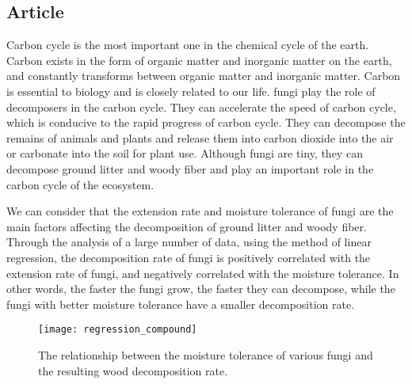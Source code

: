 \documentclass{mcmthesis}
\begin{document}
\begin{appendices}

\section{Article}







Carbon cycle is the most important one in the chemical cycle of the earth. Carbon exists in the form of organic matter and inorganic matter on the earth, and constantly transforms between organic matter and inorganic matter. Carbon is essential to biology and is closely related to our life. fungi play the role of decomposers in the carbon cycle. They can accelerate the speed of carbon cycle, which is conducive to the rapid progress of carbon cycle. They can decompose the remains of animals and plants and release them into carbon dioxide into the air or carbonate into the soil for plant use. Although fungi are tiny, they can decompose ground litter and woody fiber and play an important role in the carbon cycle of the ecosystem.


We can consider that the extension rate and moisture tolerance of fungi are the main factors affecting the decomposition of ground litter and woody fiber. Through the analysis of a large number of data, using the method of linear regression, the decomposition rate of fungi is positively correlated with the extension rate of fungi, and negatively correlated with the moisture tolerance. In other words, the faster the fungi grow, the faster they can decompose, while the fungi with better moisture tolerance have a smaller decomposition rate.

\begin{figure}[H]
  \small
  \centering
  \texttt{[image: regression\_compound]}
  \caption{The relationship between the moisture tolerance of various fungi and the resulting wood decomposition rate.}
  \label{regression_compound}
\end{figure}


\end{appendices}
\end{document}

